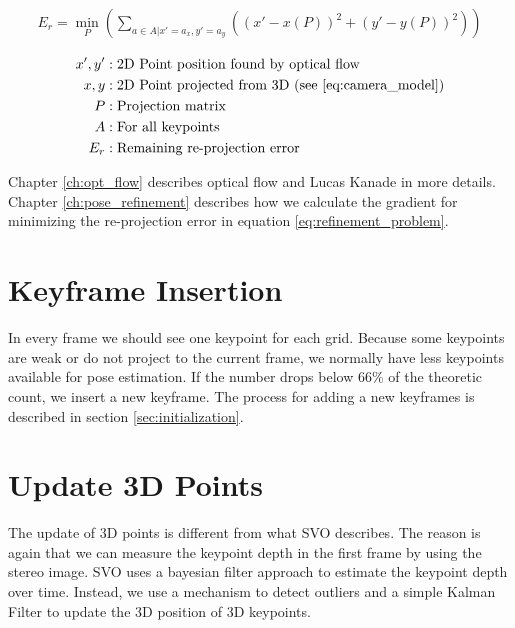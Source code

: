 \documentclass[11pt,a4paper,titlepage,oneside]{report}
\begin{document}
\begin{equation}\label{eq:refinement_problem}
  \begin{gathered}
    E_r=\min_P(\sum_{a \in A|x'=a_x,y'=a_y}((x'-x(P))^2+(y'-y(P))^2))\\
  \end{gathered}
\end{equation}
\begin{align*}
  x',y'   &: \text{2D Point position found by optical flow}\\
  x,y     &: \text{2D Point projected from 3D (see \ref{eq:camera_model})}\\
  P       &: \text{Projection matrix}\\
  A       &: \text{For all keypoints}\\
  E_r     &: \text{Remaining re-projection error}
\end{align*}

Chapter \ref{ch:opt_flow} describes optical flow and Lucas Kanade in more details. Chapter \ref{ch:pose_refinement} describes how we calculate the gradient for minimizing the re-projection error in equation \ref{eq:refinement_problem}.

\section{Keyframe Insertion}
In every frame we should see one keypoint for each grid. Because some keypoints are weak or do not project to the current frame, we normally have less keypoints available for pose estimation. If the number drops below 66\% of the theoretic count, we insert a new keyframe. The process for adding a new keyframes is described in section \ref{sec:initialization}.

\section{Update 3D Points}\label{sec:point_update}

The update of 3D points is different from what SVO \cite{svo} describes. The reason is again that we can measure the keypoint depth in the first frame by using the stereo image. SVO uses a bayesian filter approach to estimate the keypoint depth over time. Instead, we use a mechanism to detect outliers and a simple Kalman Filter to update the 3D position of 3D keypoints.
\end{document}
